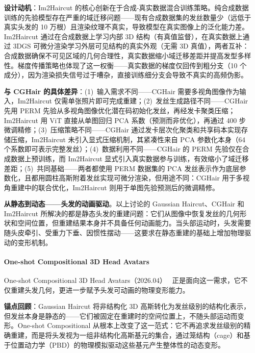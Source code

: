 \textbf{设计动机}：Im2Haircut 的核心创新在于合成-真实数据混合训练策略。纯合成数据训练的先验模型存在严重的域迁移问题——现有合成数据集的发丝数量少（远低于真实头发的 10 万根）且渲染纹理不真实，导致模型在真实图像上的泛化能力差。Im2Haircut 通过在合成数据上学习内部 3D 结构（有真值监督），在真实数据上通过 3DGS 可微分渲染学习外层可见结构的真实外观（无需 3D 真值），两者互补：合成数据确保不可见区域的几何合理性，真实数据缩小域迁移差距并提高发型多样性。梯度传播策略也体现了这一权衡——真实数据的梯度仅回传到粗分支（10 个成分），因为渲染损失信号过于嘈杂，直接训练细分支会导致不真实的高频伪影。

\textbf{与 CGHair 的具体差异}：(1)~输入需求不同——CGHair 需要多视角图像作为输入，Im2Haircut 仅需单张照片即可完成重建；(2)~发丝生成路径不同——CGHair 先用 PERM 先验从多视角图像优化潜在码初始化发丝，再经发卡聚类压缩；Im2Haircut 用 ViT 直接从单图回归 PCA 系数（预测而非优化），再通过 400 步微调精修；(3)~压缩策略不同——CGHair 通过发卡层次化聚类和共享码本实现存储压缩，Im2Haircut 未引入显式压缩机制，其紧凑性来自 PCA 参数化本身（64 个系数即可表示完整发丝）；(4)~数据利用不同——CGHair 的 PERM 先验仅在合成数据上预训练，而 Im2Haircut 显式引入真实数据参与训练，有效缩小了域迁移差距；(5)~共同基础——两者都使用 PERM 数据集的 PCA 发丝表示作为底层参数化，且都用圆柱高斯附着发丝实现可微分渲染，但用途不同：CGHair 用于多视角重建中的联合优化，Im2Haircut 则用于单图先验预测后的微调精修。

\textbf{从静态到动态——头发的动画驱动}。以上讨论的 Gaussian Haircut、CGHair 和 Im2Haircut 所解决的都是静态头发的重建问题：它们从图像中恢复发丝的几何形状和空间位置，但重建结果本身并不具备任何动画能力。当头部运动时，头发需要随头皮牵引、受重力下垂、因惯性摆动——这要求在静态重建的基础上增加物理驱动的变形机制。

\paragraph{One-shot Compositional 3D Head Avatars}

One-shot Compositional 3D Head Avatars（2026.04）~\cite{2604_14782} 正是面向这一需求，它不仅重建头发几何，更进一步赋予头发可动画的物理变形能力。

\textbf{锚点回顾}：Gaussian Haircut 将非结构化 3D 高斯转化为发丝级别的结构化表示，但发丝本身是静态的——它们被固定在重建时的空间位置上，不随头部运动而变形。One-shot Compositional 从根本上改变了这一范式：它不再追求发丝级别的精确重建，而是将头发视为一组非结构化高斯基元的集合，通过笼结构（cage）和基于位置动力学（PBD）的物理模拟驱动这些基元产生整体性的动态变形。

